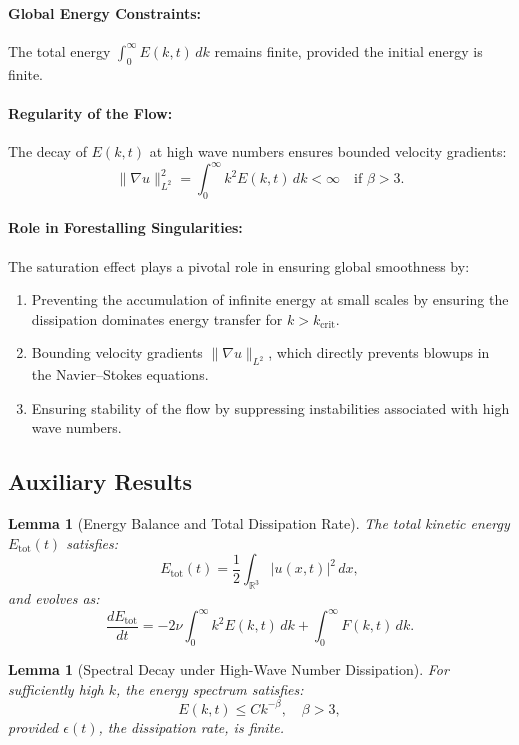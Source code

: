 \documentclass[12pt]{article}
\newtheorem{lemma}[theorem]{Lemma}
\theoremstyle{definition}
\begin{document}
\paragraph{Global Energy Constraints:}
The total energy $\int_0^\infty E(k, t) \, dk$ remains finite, provided the initial energy is finite.

\paragraph{Regularity of the Flow:}
The decay of $E(k, t)$ at high wave numbers ensures bounded velocity gradients:
\[
\|\nabla u\|_{L^2}^2 = \int_0^\infty k^2 E(k, t) \, dk < \infty \quad \text{if } \beta > 3.
\]

\paragraph{Role in Forestalling Singularities:}
The saturation effect plays a pivotal role in ensuring global smoothness by:
\begin{enumerate}
    \item Preventing the accumulation of infinite energy at small scales by ensuring the dissipation dominates energy transfer for $k > k_{\text{crit}}$.
    \item Bounding velocity gradients $\|\nabla u\|_{L^2}$, which directly prevents blowups in the Navier--Stokes equations.
    \item Ensuring stability of the flow by suppressing instabilities associated with high wave numbers.
\end{enumerate}

\subsection{Auxiliary Results}

\begin{lemma}[Energy Balance and Total Dissipation Rate]
The total kinetic energy $E_{\text{tot}}(t)$ satisfies:
\[
E_{\text{tot}}(t) = \frac{1}{2} \int_{\mathbb{R}^3} |u(x,t)|^2 \, dx,
\]
and evolves as:
\[
\frac{dE_{\text{tot}}}{dt} = -2\nu \int_0^\infty k^2 E(k,t) \, dk + \int_0^\infty F(k,t) \, dk.
\]
\end{lemma}

\begin{lemma}[Spectral Decay under High-Wave Number Dissipation]
For sufficiently high $k$, the energy spectrum satisfies:
\[
E(k, t) \leq C k^{-\beta}, \quad \beta > 3,
\]
provided $\epsilon(t)$, the dissipation rate, is finite.
\end{lemma}
\end{document}
